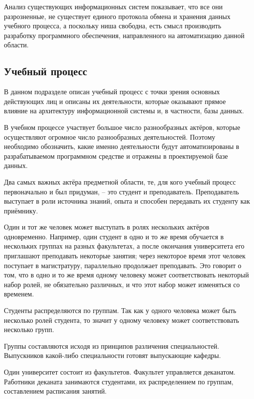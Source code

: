 Анализ существующих информационных систем показывает, что все они разрозненные, не существует единого протокола обмена и хранения данных учебного процесса, а поскольку ниша свободна, есть смысл производить разработку программного обеспечения, направленного на автоматизацию данной области.

\subsection{Учебный процесс}
\label{sec:domain:study_process}

В данном подразделе описан учебный процесс с точки зрения основных действующих лиц и описаны их деятельности, которые оказывают прямое влияние на архитектуру информационной системы и, в частности, базы данных.

В учебном процессе участвует большое число разнообразных актёров, которые осуществляют огромное число разнообразных деятельностей. Поэтому необходимо обозначить, какие именно деятельности будут автоматизированы в разрабатываемом программном средстве и отражены в проектируемой базе данных.

Два самых важных актёра предметной области, те, для кого учебный процесс первоначально и был придуман, -- это студент и преподаватель. Преподаватель выступает в роли источника знаний, опыта и способен передавать их студенту как приёмнику.

Один и тот же человек может выступать в ролях нескольких актёров одновременно. Например, один студент в одно и то же время обучается в нескольких группах на разных факультетах, а после окончания университета его приглашают преподавать некоторые занятия; через некоторое время этот человек поступает в магистратуру, параллельно продолжает преподавать. Это говорит о том, что в одно и то же время одному человеку может соответствовать некоторый набор ролей, не обязательно различных, и что этот набор может изменяться со временем.

Студенты распределяются по группам. Так как у одного человека может быть несколько ролей студента, то значит у одному человеку может соответствовать несколько групп. 

Группы составляются исходя из принципов различения специальностей. Выпускников какой-либо специальности готовят выпускающие кафедры.

Один университет состоит из факультетов. Факультет управляется деканатом. Работники деканата занимаются студентами, их распределением по группам, составлением расписания занятий. 

